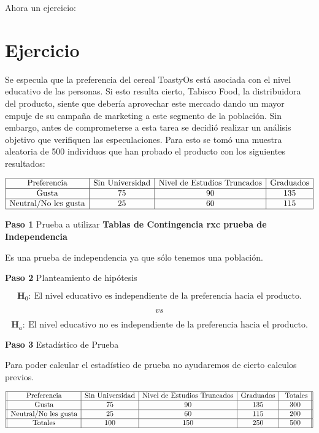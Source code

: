 \documentclass[
  a4paper,
  oneside,
  openany]{book}
\begin{document}
Ahora un ejercicio:

\hypertarget{ejercicio}{%
\section{Ejercicio}\label{ejercicio}}

Se especula que la preferencia del cereal ToastyOs está asociada con el nivel educativo de las
personas. Si esto resulta cierto, Tabisco Food, la distribuidora del producto, siente que debería
aprovechar este mercado dando un mayor empuje de su campaña de marketing a este segmento
de la población. Sin embargo, antes de comprometerse a esta tarea se decidió realizar un análisis
objetivo que verifiquen las especulaciones. Para esto se tomó una muestra aleatoria de 500
individuos que han probado el producto con los siguientes resultados:

\[
\begin{array}{|c|c|c|c|} 
\hline
\mbox{Preferencia}& \mbox{Sin Universidad}&\mbox{Nivel de Estudios Truncados}&\mbox{Graduados}\\
\hline
\mbox{Gusta}& 75&90&135\\
\hline
\mbox{Neutral/No les gusta}& 25&60&115\\
\hline
\end {array}
\]

\textbf{Paso 1} Prueba a utilizar \textbf{Tablas de Contingencia rxc prueba de Independencia}

Es una prueba de independencia ya que sólo tenemos una población.

\textbf{Paso 2} Planteamiento de hipótesis

\[\textbf{H}_0: \ \mbox{El nivel educativo es independiente de la preferencia hacia el producto.}\]

\[vs\]

\[\textbf{H}_a:\ \mbox{El nivel educativo no es independiente de la preferencia hacia el producto.}\]

\textbf{Paso 3} Estadístico de Prueba

Para poder calcular el estadístico de prueba no ayudaremos de cierto calculos previos.

\[
\begin{array}{||c| c| c |c |c||} 
\hline 
\mbox{Preferencia}& \mbox{Sin Universidad}&\mbox{Nivel de Estudios Truncados}&\mbox{Graduados} &\mbox{ Totales} \\  
 \hline
\mbox{Gusta}&75&90&135&300\\
 \hline
\mbox{Neutral/No les gusta}&25&60&115&200\\
 \hline
\mbox{Totales}&100&150&250&500\\
 \hline
\end{array}
\]
\end{document}

